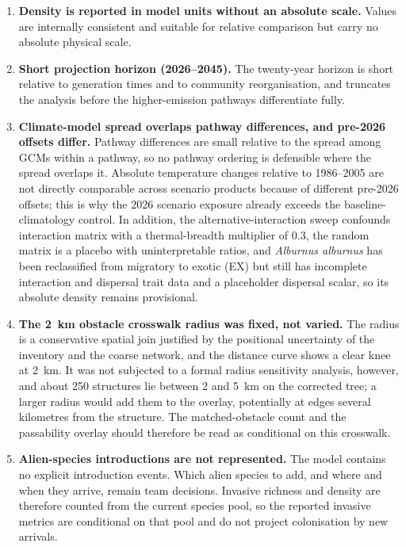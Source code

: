 \documentclass[11pt,a4paper]{article}
\begin{document}
\begin{enumerate}
    \item \textbf{Density is reported in model units without an absolute scale.} Values are internally consistent and suitable for relative comparison but carry no absolute physical scale.
    \item \textbf{Short projection horizon (2026--2045).} The twenty-year horizon is short relative to generation times and to community reorganisation, and truncates the analysis before the higher-emission pathways differentiate fully.
    \item \textbf{Climate-model spread overlaps pathway differences, and pre-2026 offsets differ.} Pathway differences are small relative to the spread among GCMs within a pathway, so no pathway ordering is defensible where the spread overlaps it. Absolute temperature changes relative to 1986--2005 are not directly comparable across scenario products because of different pre-2026 offsets; this is why the 2026 scenario exposure already exceeds the baseline-climatology control. In addition, the alternative-interaction sweep confounds interaction matrix with a thermal-breadth multiplier of 0.3, the random matrix is a placebo with uninterpretable ratios, and \textit{Alburnus alburnus} has been reclassified from migratory to exotic (EX) but still has incomplete interaction and dispersal trait data and a placeholder dispersal scalar, so its absolute density remains provisional.
    \item \textbf{The 2~km obstacle crosswalk radius was fixed, not varied.} The radius is a conservative spatial join justified by the positional uncertainty of the inventory and the coarse network, and the distance curve shows a clear knee at 2~km. It was not subjected to a formal radius sensitivity analysis, however, and about 250 structures lie between 2 and 5~km on the corrected tree; a larger radius would add them to the overlay, potentially at edges several kilometres from the structure. The matched-obstacle count and the passability overlay should therefore be read as conditional on this crosswalk.
    \item \textbf{Alien-species introductions are not represented.} The model contains no explicit introduction events. Which alien species to add, and where and when they arrive, remain team decisions. Invasive richness and density are therefore counted from the current species pool, so the reported invasive metrics are conditional on that pool and do not project colonisation by new arrivals.

\end{enumerate}
\end{document}
